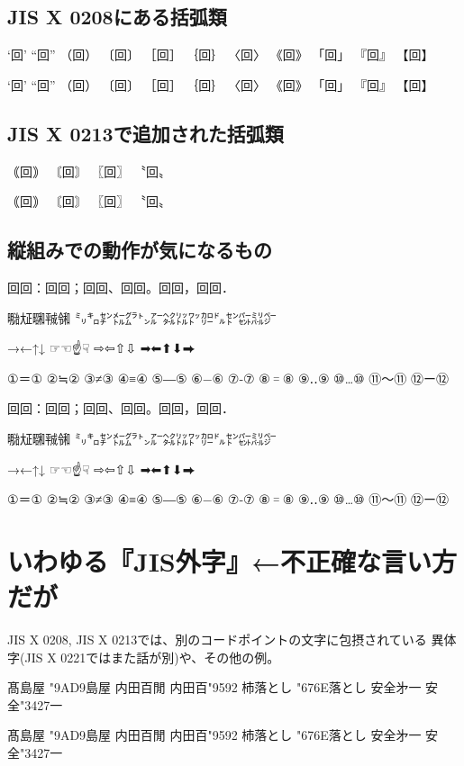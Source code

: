 \documentclass{ujarticle}
\begin{document}
\subsection{JIS X 0208にある括弧類}
‘回’ “回” （回） 〔回〕 ［回］ ｛回｝ 〈回〉 《回》 「回」 『回』 【回】

{\gt
‘回’ “回” （回） 〔回〕 ［回］ ｛回｝ 〈回〉 《回》 「回」 『回』 【回】
}


\subsection{JIS X 0213で追加された括弧類}
｟回｠ 〘回〙 〖回〗 〝回〟

{\gt
｟回｠ 〘回〙 〖回〗 〝回〟
}


\subsection{縦組みでの動作が気になるもの}
回回：回回；回回、回回。回回，回回．

㍾㍽㍼㍻㋿ ㍉㌔㌢㍍㌘㌧㌃㌶㍑㍗㌍㌦㌣㌫㍊㌻

→←↑↓ ☞☜☝☟ ⇨⇦⇧⇩ ➡⬅⬆⬇⮕

①＝① ②≒② ③≠③ ④≡④ ⑤―⑤ ⑥−⑥ ⑦‐⑦ ⑧゠⑧ ⑨‥⑨ ⑩…⑩ ⑪〜⑪ ⑫ー⑫

{\gt
回回：回回；回回、回回。回回，回回．

㍾㍽㍼㍻㋿ ㍉㌔㌢㍍㌘㌧㌃㌶㍑㍗㌍㌦㌣㌫㍊㌻

→←↑↓ ☞☜☝☟ ⇨⇦⇧⇩ ➡⬅⬆⬇⮕

①＝① ②≒② ③≠③ ④≡④ ⑤―⑤ ⑥−⑥ ⑦‐⑦ ⑧゠⑧ ⑨‥⑨ ⑩…⑩ ⑪〜⑪ ⑫ー⑫
}

\section{いわゆる『JIS外字』←不正確な言い方だが}
JIS X 0208, JIS X 0213では、別のコードポイントの文字に包摂されている
異体字(JIS X 0221ではまた話が別)や、その他の例。

髙島屋 \char"9AD9島屋\quad%
内田百閒 内田百\char"9592\quad%
杮落とし \char"676E落とし\quad%
安全﻿㐧一 安全\char"3427一\quad%

{\gt
髙島屋 \char"9AD9島屋\quad%
内田百閒 内田百\char"9592\quad%
杮落とし \char"676E落とし\quad%
安全﻿㐧一 安全\char"3427一\quad%
}
\end{document}
